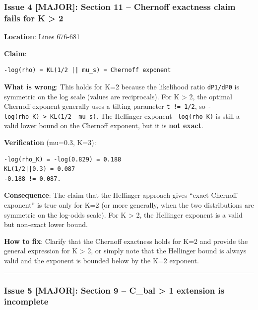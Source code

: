 \documentclass[
  12pt,
]{article}
\begin{document}
\subsubsection{Issue 4 {[}MAJOR{]}: Section 11 -- Chernoff exactness
claim fails for K \textgreater{}
2}\label{issue-4-major-section-11-chernoff-exactness-claim-fails-for-k-2}

\textbf{Location}: Lines 676-681

\textbf{Claim}:

\begin{verbatim}
-log(rho) = KL(1/2 || mu_s) = Chernoff exponent
\end{verbatim}

\textbf{What is wrong}: This holds for K=2 because the likelihood ratio
\texttt{dP1/dP0} is symmetric on the log scale (values are reciprocals).
For K \textgreater{} 2, the optimal Chernoff exponent generally uses a
tilting parameter \texttt{t\ !=\ 1/2}, so
\texttt{-log(rho\_K)\ \textgreater{}\ KL(1/2\ \textbar{}\textbar{}\ mu\_s)}.
The Hellinger exponent \texttt{-log(rho\_K)} is still a valid lower
bound on the Chernoff exponent, but it is \textbf{not exact}.

\textbf{Verification} (mu=0.3, K=3):

\begin{verbatim}
-log(rho_K) = -log(0.829) = 0.188
KL(1/2||0.3) = 0.087
-0.188 != 0.087.
\end{verbatim}

\textbf{Consequence}: The claim that the Hellinger approach gives
``exact Chernoff exponent'' is true only for K=2 (or more generally,
when the two distributions are symmetric on the log-odds scale). For K
\textgreater{} 2, the Hellinger exponent is a valid but non-exact lower
bound.

\textbf{How to fix}: Clarify that the Chernoff exactness holds for K=2
and provide the general expression for K \textgreater{} 2, or simply
note that the Hellinger bound is always valid and the exponent is
bounded below by the K=2 exponent.

\begin{center}\rule{0.5\linewidth}{0.5pt}\end{center}

\subsubsection{Issue 5 {[}MAJOR{]}: Section 9 -- C\_bal \textgreater{} 1
extension is
incomplete}\label{issue-5-major-section-9-c_bal-1-extension-is-incomplete}
\end{document}
